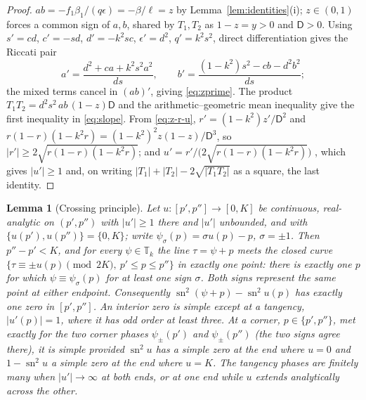 \documentclass[11pt]{article}
\newtheorem{lemma}[theorem]{Lemma}
\theoremstyle{remark}
\newcommand{\sn}{\operatorname{sn}}
\newcommand{\Torus}{\mathbb T}
\begin{document}
\begin{proof}
$ab=-f_1\beta_1/(q\epsilon)=-\beta/\ell=z$ by Lemma~\ref{lem:identities}(i);
$z\in(0,1)$ forces a common sign of $a,b$, shared by $T_1,T_2$ as
$1-z=y>0$ and $\mathsf D>0$.  Using $s'=cd$, $c'=-sd$, $d'=-k^2sc$,
$\epsilon'=d^2$, $q'=k^2s^2$, direct differentiation gives the Riccati pair
\begin{equation}\label{eq:riccati-pair}
 a'=\frac{d^2+ca+k^2s^2a^2}{ds},\qquad
 b'=\frac{(1-k^2)s^2-cb-d^2b^2}{ds};
\end{equation}
the mixed terms cancel in $(ab)'$, giving \eqref{eq:zprime}.  The product
$T_1T_2=d^2s^2\,ab\,(1-z)\mathsf D$ and the arithmetic--geometric mean
inequality give the first inequality in \eqref{eq:slope}.  From
\eqref{eq:z-r-u}, $r'=(1-k^2)z'/\mathsf D^2$ and
$r(1-r)(1-k^2r)=(1-k^2)^2z(1-z)/\mathsf D^3$, so
$|r'|\ge2\sqrt{r(1-r)(1-k^2r)}$; and $u'=r'/\bigl(2\sqrt{r(1-r)(1-k^2r)}\bigr)$
\cite[\S19.2(ii)]{DLMF}, which gives $|u'|\ge1$ and, on writing
$|T_1|+|T_2|-2\sqrt{|T_1T_2|}$ as a square, the last identity.
\end{proof}

\begin{lemma}[Crossing principle]\label{lem:crossing}
Let $u:[p',p'']\to[0,K]$ be continuous, real-analytic on $(p',p'')$ with
$|u'|\ge1$ there and $|u'|$ unbounded, and with $\{u(p'),u(p'')\}=\{0,K\}$;
write $\psi_\sigma(p)=\sigma u(p)-p$, $\sigma=\pm1$.  Then $p''-p'<K$,
and for every $\psi\in\Torus_k$ the line $\tau=\psi+p$ meets the closed
curve $\{\tau\equiv\pm u(p)\pmod{2K},\ p'\le p\le p''\}$ in exactly one
point: there is exactly one $p$ for which
$\psi\equiv\psi_\sigma(p)$ for at least one sign $\sigma$.
Both signs represent the same point at either endpoint.
Consequently $\sn^2(\psi+p)-\sn^2u(p)$ has exactly one zero in
$[p',p'']$.  An interior zero is simple except at a tangency, $|u'(p)|=1$, where
it has odd order at least three.  At a corner, $p\in\{p',p''\}$, met
exactly for the two corner phases $\psi_\pm(p')$ and $\psi_\pm(p'')$ (the
two signs agree there), it is simple provided $\sn^2u$ has a simple zero
at the end where $u=0$ and $1-\sn^2u$ a simple zero at the end where
$u=K$.  The tangency phases are finitely many when
$|u'|\to\infty$ at both ends, or at one end while $u$ extends analytically
across the other.
\end{lemma}
\end{document}
